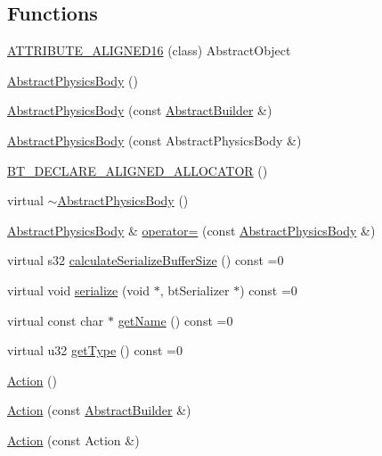 \subsection*{Functions}
\begin{DoxyCompactItemize}
\item 
\hyperlink{namespacejli_a5cb9f42798ccca4b6de51fe827ade095}{A\+T\+T\+R\+I\+B\+U\+T\+E\+\_\+\+A\+L\+I\+G\+N\+E\+D16} (class) Abstract\+Object
\item 
\hyperlink{namespacejli_a4eb9a23f0614497a7922d323a49cb822}{Abstract\+Physics\+Body} ()
\item 
\hyperlink{namespacejli_ad1a3c0146786fe6995fb9696c653555f}{Abstract\+Physics\+Body} (const \hyperlink{classjli_1_1_abstract_builder}{Abstract\+Builder} \&)
\item 
\hyperlink{namespacejli_a42235253cee125ef6fe3f35d61cb6a12}{Abstract\+Physics\+Body} (const Abstract\+Physics\+Body \&)
\item 
\hyperlink{namespacejli_a570a0b81268f888f69ad4c8b7fe6edae}{B\+T\+\_\+\+D\+E\+C\+L\+A\+R\+E\+\_\+\+A\+L\+I\+G\+N\+E\+D\+\_\+\+A\+L\+L\+O\+C\+A\+T\+O\+R} ()
\item 
virtual \hyperlink{namespacejli_aacaf3d149e42af3ba68c1225ccbe6797}{$\sim$\+Abstract\+Physics\+Body} ()
\item 
\hyperlink{namespacejli_a4eb9a23f0614497a7922d323a49cb822}{Abstract\+Physics\+Body} \& \hyperlink{namespacejli_abf374f753c2ae3833479fc522c07b7a9}{operator=} (const \hyperlink{namespacejli_a4eb9a23f0614497a7922d323a49cb822}{Abstract\+Physics\+Body} \&)
\item 
virtual s32 \hyperlink{namespacejli_a643ba9aff12ba46ade9719f4d8c08303}{calculate\+Serialize\+Buffer\+Size} () const =0
\item 
virtual void \hyperlink{namespacejli_aa823f0f9cca7324a986925864ae004f6}{serialize} (void $\ast$, bt\+Serializer $\ast$) const =0
\item 
virtual const char $\ast$ \hyperlink{namespacejli_a3b3d389101633767ffe8029193e7ce05}{get\+Name} () const =0
\item 
virtual u32 \hyperlink{namespacejli_ab742f1c07eed63b74053aa01c3193d1f}{get\+Type} () const =0
\item 
\hyperlink{namespacejli_ac1d6edc4f796157e771fb531302807c5}{Action} ()
\item 
\hyperlink{namespacejli_a372d9d21f05940e5e2e7728e51e5497e}{Action} (const \hyperlink{classjli_1_1_abstract_builder}{Abstract\+Builder} \&)
\item 
\hyperlink{namespacejli_a56537e2852192599346977eae126cf3f}{Action} (const Action \&)

\end{DoxyCompactItemize}
